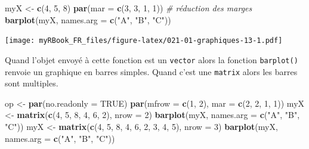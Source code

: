 \documentclass[
]{book}
\newenvironment{Shaded}{\begin{snugshade}}{\end{snugshade}}
\newcommand{\CommentTok}[1]{\textcolor[rgb]{0.56,0.35,0.01}{\textit{#1}}}
\newcommand{\DataTypeTok}[1]{\textcolor[rgb]{0.13,0.29,0.53}{#1}}
\newcommand{\DecValTok}[1]{\textcolor[rgb]{0.00,0.00,0.81}{#1}}
\newcommand{\KeywordTok}[1]{\textcolor[rgb]{0.13,0.29,0.53}{\textbf{#1}}}
\newcommand{\NormalTok}[1]{#1}
\newcommand{\OtherTok}[1]{\textcolor[rgb]{0.56,0.35,0.01}{#1}}
\newcommand{\StringTok}[1]{\textcolor[rgb]{0.31,0.60,0.02}{#1}}
\begin{document}
\begin{Shaded}
\begin{Highlighting}[]
\NormalTok{myX <-}\StringTok{ }\KeywordTok{c}\NormalTok{(}\DecValTok{4}\NormalTok{, }\DecValTok{5}\NormalTok{, }\DecValTok{8}\NormalTok{)}
\KeywordTok{par}\NormalTok{(}\DataTypeTok{mar =} \KeywordTok{c}\NormalTok{(}\DecValTok{3}\NormalTok{, }\DecValTok{3}\NormalTok{, }\DecValTok{1}\NormalTok{, }\DecValTok{1}\NormalTok{)) }\CommentTok{# réduction des marges}
\KeywordTok{barplot}\NormalTok{(myX, }\DataTypeTok{names.arg =} \KeywordTok{c}\NormalTok{(}\StringTok{"A"}\NormalTok{, }\StringTok{"B"}\NormalTok{, }\StringTok{"C"}\NormalTok{))}
\end{Highlighting}
\end{Shaded}

\texttt{[image: myRBook\_FR\_files/figure-latex/021-01-graphiques-13-1.pdf]}

Quand l'objet envoyé à cette fonction est un \texttt{vector} alors la fonction \texttt{barplot()} renvoie un graphique en barres simples. Quand c'est une \texttt{matrix} alors les barres sont multiples.

\begin{Shaded}
\begin{Highlighting}[]
\NormalTok{op <-}\StringTok{ }\KeywordTok{par}\NormalTok{(}\DataTypeTok{no.readonly =} \OtherTok{TRUE}\NormalTok{)}
\KeywordTok{par}\NormalTok{(}\DataTypeTok{mfrow =} \KeywordTok{c}\NormalTok{(}\DecValTok{1}\NormalTok{, }\DecValTok{2}\NormalTok{), }\DataTypeTok{mar =} \KeywordTok{c}\NormalTok{(}\DecValTok{2}\NormalTok{, }\DecValTok{2}\NormalTok{, }\DecValTok{1}\NormalTok{, }\DecValTok{1}\NormalTok{))}
\NormalTok{myX <-}\StringTok{ }\KeywordTok{matrix}\NormalTok{(}\KeywordTok{c}\NormalTok{(}\DecValTok{4}\NormalTok{, }\DecValTok{5}\NormalTok{, }\DecValTok{8}\NormalTok{, }\DecValTok{4}\NormalTok{, }\DecValTok{6}\NormalTok{, }\DecValTok{2}\NormalTok{), }\DataTypeTok{nrow =} \DecValTok{2}\NormalTok{)}
\KeywordTok{barplot}\NormalTok{(myX, }\DataTypeTok{names.arg =} \KeywordTok{c}\NormalTok{(}\StringTok{"A"}\NormalTok{, }\StringTok{"B"}\NormalTok{, }\StringTok{"C"}\NormalTok{))}
\NormalTok{myX <-}\StringTok{ }\KeywordTok{matrix}\NormalTok{(}\KeywordTok{c}\NormalTok{(}\DecValTok{4}\NormalTok{, }\DecValTok{5}\NormalTok{, }\DecValTok{8}\NormalTok{, }\DecValTok{4}\NormalTok{, }\DecValTok{6}\NormalTok{, }\DecValTok{2}\NormalTok{, }\DecValTok{3}\NormalTok{, }\DecValTok{4}\NormalTok{, }\DecValTok{5}\NormalTok{), }\DataTypeTok{nrow =} \DecValTok{3}\NormalTok{)}
\KeywordTok{barplot}\NormalTok{(myX, }\DataTypeTok{names.arg =} \KeywordTok{c}\NormalTok{(}\StringTok{"A"}\NormalTok{, }\StringTok{"B"}\NormalTok{, }\StringTok{"C"}\NormalTok{))}
\end{Highlighting}
\end{Shaded}
\end{document}

